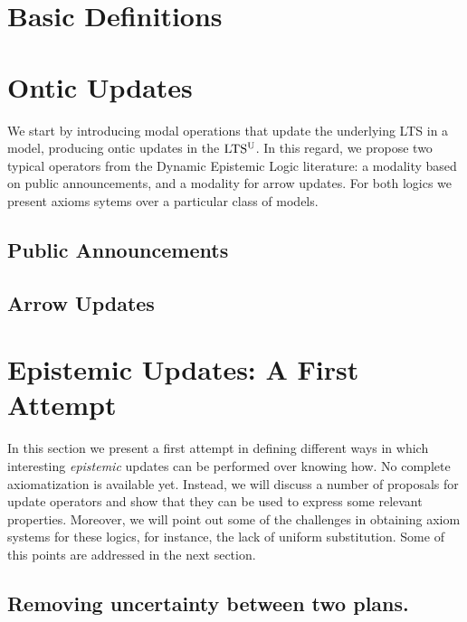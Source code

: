 \documentclass[sn-mathphys-num]{sn-jnl}%
\begin{document}
\section{Basic Definitions}
\label{sec:basic}




\section{Ontic Updates}
\label{sec:ontic}

We start by introducing modal operations that update the underlying LTS in a model, producing ontic updates in the $\textup{LTS$^\text{\textup{U}}$}$. In this regard, we propose two typical operators from the Dynamic Epistemic Logic literature: a modality based on public announcements, and a modality for arrow updates. For both logics we present axioms sytems over a particular class of models.

\subsection{Public Announcements}
\label{sec:pal}


\subsection{Arrow Updates}
\label{sec:aul}


\section{Epistemic Updates: A First Attempt}
\label{sec:epistemic-basic} 

In this section we present a first attempt in defining different  
ways in which interesting \emph{epistemic} updates can be performed over knowing how. No complete axiomatization is
available yet.  Instead, we will discuss a number of proposals for update
operators and show that they can be used to express some relevant properties.
Moreover, we will point out some of the challenges in obtaining axiom systems for these logics, for instance, the lack of uniform substitution. Some of this points are addressed in the next section.

\subsection{Removing uncertainty between two plans.}
\label{sec:ref}

\end{document}
